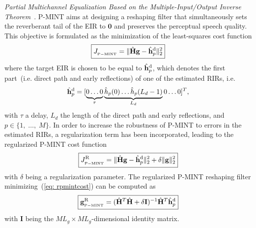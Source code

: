 \documentclass{article}
\begin{document}
\textit{Partial Multichannel Equalization Based on the Multiple-Input/Output Inverse Theorem}~\cite{Kodrasi_ITASLP_2013}. \enspace
P-MINT aims at designing a reshaping filter that simultaneously sets the reverberant tail of the EIR to $\mathbf{0}$ and preserves the perceptual speech quality.
This objective is formulated as the minimization of the least-squares cost function
\begin{equation}
\label{eq: pmintcost}
\boxed{J_{_{\rm P-MINT}} = \|\hat{\mathbf{H}}\mathbf{g} - \hat{\mathbf{h}}_p^{\rm d}\|_2^2}
\end{equation}
where the target EIR is chosen to be equal to $\hat{\mathbf{h}}_p^{\rm d}$, which denotes the first part~(i.e. direct path and early reflections) of one of the estimated RIRs, i.e.
\begin{equation}
\hat{\mathbf{h}}_{p}^{\rm d} = [\underbrace{0\phantom{\rlap{$(L_d-1)$}} \ldots 0 }_{\tau} \underbrace{\hat{h}_p(0) \ldots \hat{h}_p(L_d-1)}_{L_d} 0 \ldots 0 ]^{T},
\end{equation}
with $\tau$ a delay, $L_d$ the length of the direct path and early reflections, and $p \in \{1, \; \ldots, \; M\}$.
In order to increase the robustness of P-MINT to errors in the estimated RIRs, a regularization term has been incorporated, leading to the regularized P-MINT cost function
\begin{equation}
  \label{eq: rpmintcost}
  \boxed{J_{_{\rm P-MINT}}^{{\rm R}} = \|\hat{\mathbf{H}}\mathbf{g} - \hat{\mathbf{h}}_p^{\rm d}\|_2^2 + \delta \|\mathbf{g}\|_2^2}
\end{equation}
with $\delta$ being a regularization parameter.
The regularized P-MINT reshaping filter minimizing~(\ref{eq: rpmintcost}) can be computed as
\begin{equation}
  \label{eq: rpmintsol}
  \boxed{\mathbf{g}_{_{\rm P-MINT}}^{{\rm R}} = (\hat{\mathbf{H}}^T\hat{\mathbf{H}}+\delta \mathbf{I})^{-1} \hat{\mathbf{H}}^T \hat{\mathbf{h}}_p^{\rm d}}
\end{equation}
with $\mathbf{I}$ being the $ML_g \times ML_g$-dimensional identity matrix.
\end{document}
